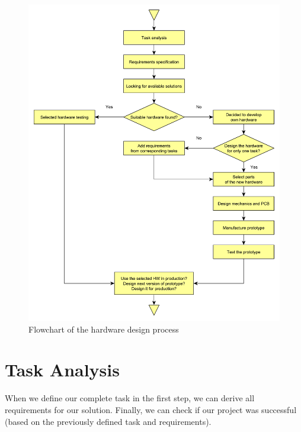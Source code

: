\begin{figure}
    \centering
    \caption{Flowchart of the hardware design process}
    \label{fig:HWprocess}
    \includegraphics[width=\linewidth]{img/HWdesignProcess.pdf}
\end{figure}

\section{Task Analysis}
\label{HWtaskAnalysis}
When we define our complete task in the first step, we can derive all requirements for our solution. Finally, we can check if our project was successful (based on the previously defined task and requirements).


